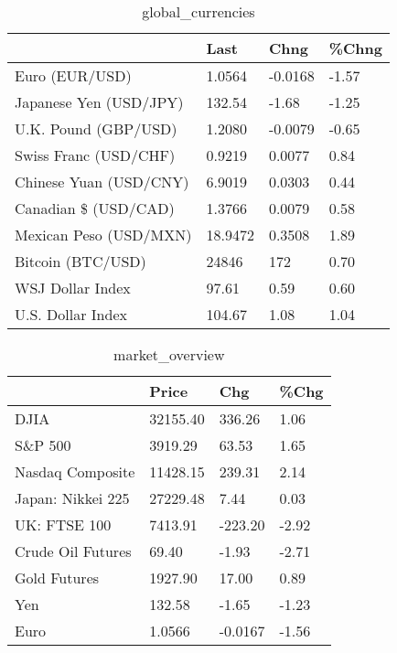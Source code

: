\documentclass{article}%
\begin{document}
%


\begin{table}[htbp]%
\caption{global\_currencies}%
\centering%
\begin{adjustbox}{width=1\textwidth}%
\begin{tabular}{llll}
\toprule
                       &    Last &    Chng & \%Chng \\
\midrule
        Euro (EUR/USD) &  1.0564 & -0.0168 & -1.57 \\
Japanese Yen (USD/JPY) &  132.54 &   -1.68 & -1.25 \\
  U.K. Pound (GBP/USD) &  1.2080 & -0.0079 & -0.65 \\
 Swiss Franc (USD/CHF) &  0.9219 &  0.0077 &  0.84 \\
Chinese Yuan (USD/CNY) &  6.9019 &  0.0303 &  0.44 \\
  Canadian \$ (USD/CAD) &  1.3766 &  0.0079 &  0.58 \\
Mexican Peso (USD/MXN) & 18.9472 &  0.3508 &  1.89 \\
     Bitcoin (BTC/USD) &   24846 &     172 &  0.70 \\
      WSJ Dollar Index &   97.61 &    0.59 &  0.60 \\
     U.S. Dollar Index &  104.67 &    1.08 &  1.04 \\
\bottomrule
\end{tabular}
%
\end{adjustbox}%
\end{table}

%


\begin{table}[htbp]%
\caption{market\_overview}%
\centering%
\begin{adjustbox}{width=1\textwidth}%
\begin{tabular}{llll}
\toprule
                  &    Price &     Chg &  \%Chg \\
\midrule
             DJIA & 32155.40 &  336.26 &  1.06 \\
          S\&P 500 &  3919.29 &   63.53 &  1.65 \\
 Nasdaq Composite & 11428.15 &  239.31 &  2.14 \\
Japan: Nikkei 225 & 27229.48 &    7.44 &  0.03 \\
     UK: FTSE 100 &  7413.91 & -223.20 & -2.92 \\
Crude Oil Futures &    69.40 &   -1.93 & -2.71 \\
     Gold Futures &  1927.90 &   17.00 &  0.89 \\
              Yen &   132.58 &   -1.65 & -1.23 \\
             Euro &   1.0566 & -0.0167 & -1.56 \\
\bottomrule
\end{tabular}
%
\end{adjustbox}%
\end{table}

%
\end{document}

